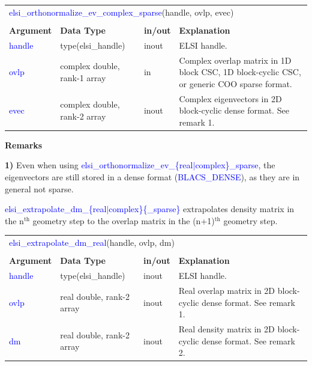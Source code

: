 \documentclass{report}
\newcommand{\tcb}[1]{\textcolor{blue}{#1}}
\begin{document}
\begin{tabular}[]{|p{20mm}|p{45mm}|p{15mm}|p{85mm}|}
\multicolumn{4}{l}{\tcb{elsi\_orthonormalize\_ev\_complex\_sparse}(handle, ovlp, evec)}\\
\multicolumn{4}{l}{}\\
\hline
\multicolumn{1}{|l|}{\textbf{Argument}} & \multicolumn{1}{l|}{\textbf{Data Type}} & \multicolumn{1}{l|}{\textbf{in/out}} & \multicolumn{1}{l|}{\textbf{Explanation}}\\
\hline
\tcb{handle} & type(elsi\_handle)           & inout & ELSI handle.\\
\hline
\tcb{ovlp}   & complex double, rank-1 array & in    & Complex overlap matrix in 1D block CSC, 1D block-cyclic CSC, or generic COO sparse format.\\
\hline
\tcb{evec}   & complex double, rank-2 array & inout & Complex eigenvectors in 2D block-cyclic dense format. See remark 1.\\
\hline
\end{tabular}

\textbf{Remarks}

\textbf{1)} Even when using \tcb{elsi\_orthonormalize\_ev\_\{real$\vert$complex\}\_sparse}, the eigenvectors are still stored in a dense format (\tcb{BLACS\_DENSE}), as they are in general not sparse.

\tcb{elsi\_extrapolate\_dm\_\{real$\vert$complex\}\{\_sparse\}} extrapolates density matrix in the n$^\text{th}$ geometry step to the overlap matrix in the (n+1)$^\text{th}$ geometry step.

\begin{tabular}[]{|p{20mm}|p{45mm}|p{15mm}|p{85mm}|}
\multicolumn{4}{l}{\tcb{elsi\_extrapolate\_dm\_real}(handle, ovlp, dm)}\\
\multicolumn{4}{l}{}\\
\hline
\multicolumn{1}{|l|}{\textbf{Argument}} & \multicolumn{1}{l|}{\textbf{Data Type}} & \multicolumn{1}{l|}{\textbf{in/out}} & \multicolumn{1}{l|}{\textbf{Explanation}}\\
\hline
\tcb{handle} & type(elsi\_handle)        & inout & ELSI handle.\\
\hline
\tcb{ovlp}   & real double, rank-2 array & inout & Real overlap matrix in 2D block-cyclic dense format. See remark 1.\\
\hline
\tcb{dm}     & real double, rank-2 array & inout & Real density matrix in 2D block-cyclic dense format. See remark 2.\\
\hline
\end{tabular}
\end{document}

